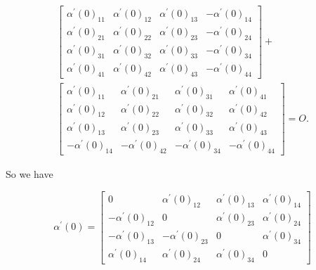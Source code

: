 \documentclass[10pt, letterpaper]{article}
\begin{document}
$$
\begin{gathered}
{\left[\begin{array}{llll}
\alpha^{\prime}(0)_{11} & \alpha^{\prime}(0)_{12} & \alpha^{\prime}(0)_{13} & -\alpha^{\prime}(0)_{14} \\
\alpha^{\prime}(0)_{21} & \alpha^{\prime}(0)_{22} & \alpha^{\prime}(0)_{23} & -\alpha^{\prime}(0)_{24} \\
\alpha^{\prime}(0)_{31} & \alpha^{\prime}(0)_{32} & \alpha^{\prime}(0)_{33} & -\alpha^{\prime}(0)_{34} \\
\alpha^{\prime}(0)_{41} & \alpha^{\prime}(0)_{42} & \alpha^{\prime}(0)_{43} & -\alpha^{\prime}(0)_{44}
\end{array}\right]+} \\
{\left[\begin{array}{cccc}
\alpha^{\prime}(0)_{11} & \alpha^{\prime}(0)_{21} & \alpha^{\prime}(0)_{31} & \alpha^{\prime}(0)_{41} \\
\alpha^{\prime}(0)_{12} & \alpha^{\prime}(0)_{22} & \alpha^{\prime}(0)_{32} & \alpha^{\prime}(0)_{42} \\
\alpha^{\prime}(0)_{13} & \alpha^{\prime}(0)_{23} & \alpha^{\prime}(0)_{33} & \alpha^{\prime}(0)_{43} \\
-\alpha^{\prime}(0)_{14} & -\alpha^{\prime}(0)_{42} & -\alpha^{\prime}(0)_{34} & -\alpha^{\prime}(0)_{44}
\end{array}\right]=O .}
\end{gathered}
$$

So we have

$$
\alpha^{\prime}(0)=\left[\begin{array}{cccc}
0 & \alpha^{\prime}(0)_{12} & \alpha^{\prime}(0)_{13} & \alpha^{\prime}(0)_{14} \\
-\alpha^{\prime}(0)_{12} & 0 & \alpha^{\prime}(0)_{23} & \alpha^{\prime}(0)_{24} \\
-\alpha^{\prime}(0)_{13} & -\alpha^{\prime}(0)_{23} & 0 & \alpha^{\prime}(0)_{34} \\
\alpha^{\prime}(0)_{14} & \alpha^{\prime}(0)_{24} & \alpha^{\prime}(0)_{34} & 0
\end{array}\right]
$$
\end{document}
